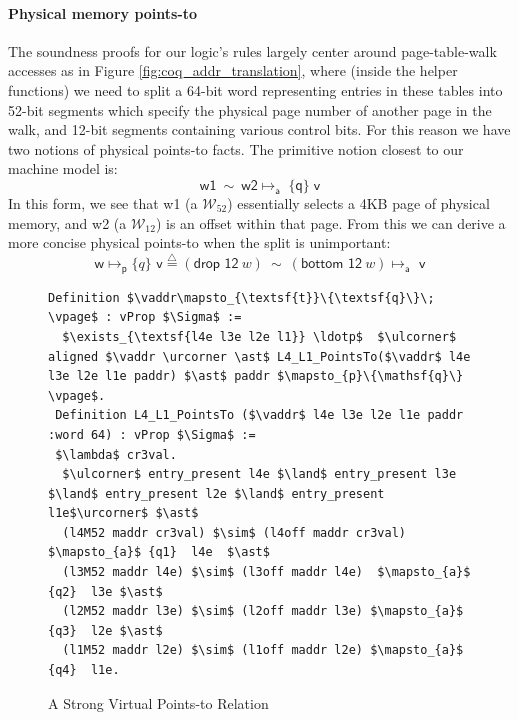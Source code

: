 \paragraph{Physical memory  points-to} The soundness proofs for our logic's rules largely center around page-table-walk accesses as in Figure \ref{fig:coq_addr_translation},
 where (inside the helper functions) we need to split a 64-bit word representing entries in these tables into 52-bit segments
which specify the physical page number of another page in the walk, and 12-bit segments containing various control bits.
For this reason we have two notions of physical points-to facts. The primitive notion closest to our machine model is:
\[ \textsf{w1} \ \sim \ \textsf{w2} \mapsto_{\textsf{a}} \; \{\textsf{q}\} \; \textsf{v} \]
In this form, we see that \textsf{w1} (a $\mathcal{W}_{52}$) essentially selects a 4KB page of physical memory,
and \textsf{w2} (a $\mathcal{W}_{12}$) is an offset within that page.
From this we can derive a more concise physical points-to when the split is unimportant:
\[\textsf{w} \mapsto_{\textsf{p}} \{q\} \textsf{ v} \stackrel{\triangle}{=} (\textsf{drop 12}~w) \ \sim \ (\textsf{bottom 12}~w)\mapsto_{\textsf{a}} \textsf{ v} \]

\begin{figure}
  \begin{lstlisting}[language=Coq]
 Definition $\vaddr\mapsto_{\textsf{t}}\{\textsf{q}\}\; \vpage$ : vProp $\Sigma$ := 
  $\exists_{\textsf{l4e l3e l2e l1}} \ldotp$  $\ulcorner$ aligned $\vaddr \urcorner \ast$ L4_L1_PointsTo($\vaddr$ l4e l3e l2e l1e paddr) $\ast$ paddr $\mapsto_{p}\{\mathsf{q}\} \vpage$.
 Definition L4_L1_PointsTo ($\vaddr$ l4e l3e l2e l1e paddr :word 64) : vProp $\Sigma$ :=
 $\lambda$ cr3val.
  $\ulcorner$ entry_present l4e $\land$ entry_present l3e $\land$ entry_present l2e $\land$ entry_present l1e$\urcorner$ $\ast$
  (l4M52 maddr cr3val) $\sim$ (l4off maddr cr3val) $\mapsto_{a}$ {q1}  l4e  $\ast$
  (l3M52 maddr l4e) $\sim$ (l3off maddr l4e)  $\mapsto_{a}$ {q2}  l3e $\ast$ 
  (l2M52 maddr l3e) $\sim$ (l2off maddr l3e) $\mapsto_{a}$ {q3}  l2e $\ast$
  (l1M52 maddr l2e) $\sim$ (l1off maddr l2e) $\mapsto_{a}$ {q4}  l1e.
\end{lstlisting}
\vspace{-1em}
\caption{A Strong Virtual Points-to Relation}
  \label{fig:strongvirtualpointsto}
\end{figure}



